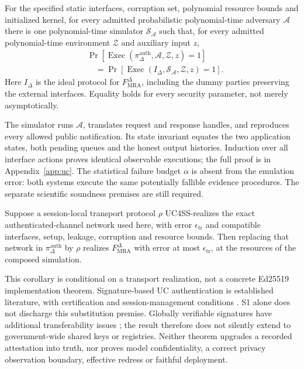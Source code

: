\begin{uctheorem}
\label{uc-thm:realization}
For the specified static interfaces, corruption set, polynomial resource
bounds and initialized kernel, for every admitted probabilistic
polynomial-time adversary $\mathcal A$ there is one polynomial-time
simulator $\mathcal S_{\mathcal A}$ such that, for every admitted
polynomial-time environment $\mathcal Z$ and auxiliary input $z$,
\[
\begin{split}
 &\Pr[\operatorname{Exec}(\pi_\Delta^{\mathrm{auth}},
                    \mathcal A,\mathcal Z,z)=1]\\
 &\quad=\Pr[\operatorname{Exec}(I_\Delta,
                    \mathcal S_{\mathcal A},\mathcal Z,z)=1].
\end{split}
\]
Here $I_\Delta$ is the ideal protocol for $F_{\mathrm{MRA}}^\Delta$,
including the dummy parties preserving the external interfaces.
Equality holds for every security parameter, not merely asymptotically.
\end{uctheorem}

The simulator runs $\mathcal A$, translates request and response handles,
and reproduces every allowed public notification. Its state invariant
equates the two application states, both pending queues and the honest
output histories. Induction over all interface actions proves identical
observable executions; the full proof is in Appendix~\ref{app:uc}.
The statistical failure budget $\alpha$ is absent from the emulation error:
both systems execute the same potentially fallible evidence procedures.
The separate scientific soundness premises are still required.

\begin{uctheorem}
\label{uc-thm:transport}
Suppose a session-local transport protocol $\rho$ UC4SS-realizes the exact
authenticated-channel network used here, with error
$\epsilon_{\mathrm{tr}}$ and compatible interfaces, setup, leakage,
corruption and resource bounds. Then replacing that network in
$\pi_\Delta^{\mathrm{auth}}$ by $\rho$ realizes
$F_{\mathrm{MRA}}^\Delta$ with error at most $\epsilon_{\mathrm{tr}}$,
at the resources of the composed simulation.
\end{uctheorem}

This corollary is conditional on a transport realization, not a concrete
Ed25519 implementation theorem. Signature-based UC authentication is
established literature, with certification and session-management conditions
\citep{canetti2004authentication}. S1 alone does not discharge this
substitution premise. Globally verifiable signatures have additional
transferability issues \citep{canetti2016globalpki}; the result therefore
does not silently extend to government-wide shared keys or registries.
Neither theorem upgrades a recorded attestation into truth, nor proves
model confidentiality, a correct privacy observation boundary, effective
redress or faithful deployment.
